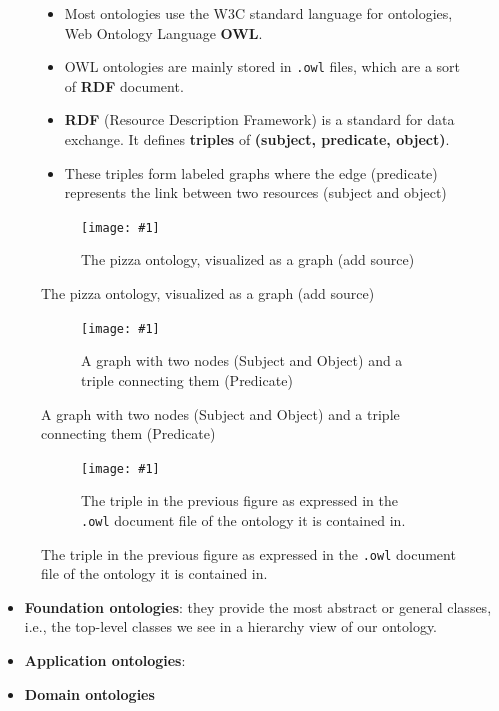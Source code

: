 \documentclass[english, xcolor=dvipsnames, aspectratio=169]{beamer}
\newcommand{\includefigurelarger}[2]
{
    \begin{figure}[h]
    \caption{#2}
    \centering
    \texttt{[image: \#1]}
    \end{figure}
}
\newcommand{\subsectiontitle}{}
\begin{document}
\begin{frame}{\subsectiontitle}
    \begin{figure}
        \begin{minipage}[b]{0.55\linewidth}
 			\begin{itemize}
\item Most ontologies use the W3C standard language for ontologies, Web Ontology Language \textbf{OWL}.
\item OWL ontologies are mainly stored in \texttt{.owl} files, which are a sort of \textbf{RDF} document.
\item \textbf{RDF} (Resource Description Framework) is a standard for data exchange. It defines \textbf{triples} of \textbf{(subject, predicate, object)}.
\item These triples form labeled graphs where the edge (predicate) represents the link between two resources (subject and object)
    		\end{itemize}
        \end{minipage}
    \hfill
     \begin{minipage}[b]{0.4\linewidth}
            \centering
            \includefigurelarger{pizzaontology.png}{The pizza ontology, visualized as a graph (add source)}
        \end{minipage}
    \end{figure}
\end{frame}


% 
\begin{frame}{\subsectiontitle}

     
\begin{figure}
    
    \centering
	\includefigurelarger{rdf-graph-triple.pdf}{A graph with two nodes (Subject and Object) and a triple connecting them (Predicate)}
    \end{figure}
\end{frame}

% 
\begin{frame}{\subsectiontitle}

     
\begin{figure}
    \centering
	\includefigurelarger{rdf-owl.pdf}{The triple in the previous figure as expressed in the \texttt{.owl} document file of the ontology it is contained in.}
    \end{figure}
\end{frame}

% 

\begin{frame}{\subsectiontitle}
    \begin{itemize}
        \item \textbf{Foundation ontologies}: they provide the most abstract or general classes, i.e., the top-level classes we see in a hierarchy view of our ontology.
        \item \textbf{Application ontologies}:
        \item \textbf{Domain ontologies}
    \end{itemize}
\end{frame}
\end{document}
